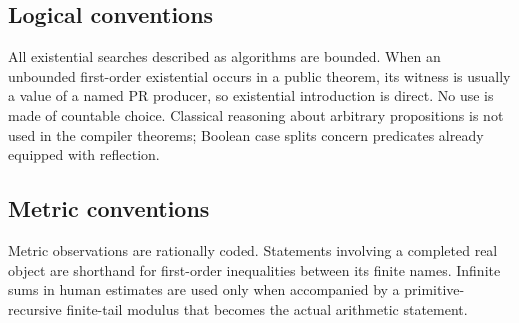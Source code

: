 \subsection*{Logical conventions}

All existential searches described as algorithms are bounded.  When an
unbounded first-order existential occurs in a public theorem, its witness is
usually a value of a named PR producer, so existential introduction is direct.
No use is made of countable choice.  Classical reasoning about arbitrary
propositions is not used in the compiler theorems; Boolean case splits concern
predicates already equipped with reflection.

\subsection*{Metric conventions}

Metric observations are rationally coded.  Statements involving a completed
real object are shorthand for first-order inequalities between its finite
names.  Infinite sums in human estimates are used only when accompanied by a
primitive-recursive finite-tail modulus that becomes the actual arithmetic
statement.
